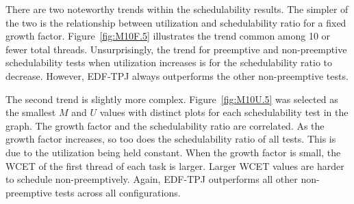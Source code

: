 There are two noteworthy trends within the schedulability results.
The simpler of the two is the relationship between utilization and
schedulability ratio for a fixed growth
factor. Figure~\ref{fig:M10F.5} illustrates the trend common among 10
or fewer total threads. Unsurprisingly, the trend for preemptive and
non-preemptive schedulability tests when utilization increases is for the
schedulability ratio to decrease. However, EDF-TPJ always outperforms
the other non-preemptive tests. 

The second trend is slightly more complex. Figure~\ref{fig:M10U.5} was
selected as the smallest ${M}$ and ${U}$ values with distinct plots
for each schedulability test in the graph. The growth factor and the
schedulability ratio are correlated. As the growth factor increases,
so too does the schedulability ratio of all tests. This is due to
the utilization being held constant. When the growth factor is small,
the WCET of the first thread of each task is larger. Larger WCET values
are harder to schedule non-preemptively. Again, EDF-TPJ outperforms
all other non-preemptive tests across all configurations.

